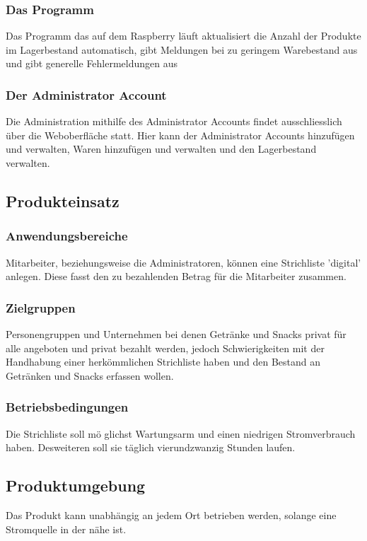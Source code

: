 \documentclass[11pt,a4paper]{article} %
\begin{document}
\subsubsection{Das Programm}
Das Programm das auf dem Raspberry l\"auft aktualisiert die Anzahl der Produkte im Lagerbestand automatisch, gibt Meldungen bei zu geringem Warebestand aus und gibt generelle Fehlermeldungen aus

\subsubsection{Der Administrator Account}
Die Administration mithilfe des Administrator Accounts findet ausschliesslich \"uber die Weboberfl\"ache statt. Hier kann der Administrator Accounts hinzuf\"ugen und verwalten, Waren hinzuf\"ugen und verwalten und den Lagerbestand verwalten.

\subsection{Produkteinsatz}
\subsubsection{Anwendungsbereiche}
Mitarbeiter, beziehungsweise die Administratoren, k\"onnen eine Strichliste 'digital' anlegen. Diese fasst den zu bezahlenden Betrag f\"ur die Mitarbeiter zusammen.

\subsubsection{Zielgruppen}
Personengruppen und Unternehmen bei denen Getr\"anke und Snacks privat f\"ur alle angeboten und privat bezahlt werden, jedoch Schwierigkeiten mit der Handhabung einer herk\"ommlichen Strichliste haben und den Bestand an Getr\"anken und Snacks erfassen wollen.

\subsubsection{Betriebsbedingungen}
Die Strichliste soll m\"o
glichst Wartungsarm und einen niedrigen Stromverbrauch haben. Desweiteren soll sie t\"aglich vierundzwanzig Stunden laufen.

\subsection{Produktumgebung}
Das Produkt kann unabh\"angig an jedem Ort betrieben werden, solange eine Stromquelle in der n\"ahe ist.
\end{document}
